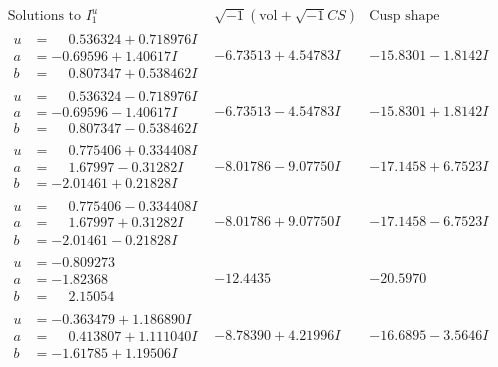 \documentclass[1p]{elsarticle_modified}
\theoremstyle{definition}
\newcommand{\I}{\sqrt{-1}}
\begin{document}
$$\begin{array}{c|c|c}  
\text{Solutions to }I^u_{1}& \I (\text{vol} + \sqrt{-1}CS) & \text{Cusp shape}\\
 \hline 
\begin{aligned}
u &= \phantom{-}0.536324 + 0.718976 I \\
a &= -0.69596 + 1.40617 I \\
b &= \phantom{-}0.807347 + 0.538462 I\end{aligned}
 & -6.73513 + 4.54783 I & -15.8301 - 1.8142 I \\ \hline\begin{aligned}
u &= \phantom{-}0.536324 - 0.718976 I \\
a &= -0.69596 - 1.40617 I \\
b &= \phantom{-}0.807347 - 0.538462 I\end{aligned}
 & -6.73513 - 4.54783 I & -15.8301 + 1.8142 I \\ \hline\begin{aligned}
u &= \phantom{-}0.775406 + 0.334408 I \\
a &= \phantom{-}1.67997 - 0.31282 I \\
b &= -2.01461 + 0.21828 I\end{aligned}
 & -8.01786 - 9.07750 I & -17.1458 + 6.7523 I \\ \hline\begin{aligned}
u &= \phantom{-}0.775406 - 0.334408 I \\
a &= \phantom{-}1.67997 + 0.31282 I \\
b &= -2.01461 - 0.21828 I\end{aligned}
 & -8.01786 + 9.07750 I & -17.1458 - 6.7523 I \\ \hline\begin{aligned}
u &= -0.809273\phantom{ +0.000000I} \\
a &= -1.82368\phantom{ +0.000000I} \\
b &= \phantom{-}2.15054\phantom{ +0.000000I}\end{aligned}
 & -12.4435\phantom{ +0.000000I} & -20.5970\phantom{ +0.000000I} \\ \hline\begin{aligned}
u &= -0.363479 + 1.186890 I \\
a &= \phantom{-}0.413807 + 1.111040 I \\
b &= -1.61785 + 1.19506 I\end{aligned}
 & -8.78390 + 4.21996 I & -16.6895 - 3.5646 I \\ \hline\begin{aligned}

\end{aligned}
\end{array}$$
\end{document}
